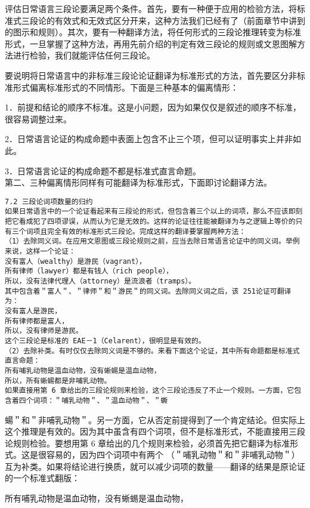 评估日常语言三段论要满足两个条件。首先，要有一种便于应用的检验方法，将标准式三段论的有效式和无效式区分开来，这种方法我们已经有了（前面章节中讲到的图示和规则）。其次，要有一种翻译方法，将任何形式的三段论推理转变为标准形式，一旦掌握了这种方法，再用先前介绍的判定有效三段论的规则或文恩图解方法进行检验，我们就能评估任何三段论。

要说明将日常语言中的非标准三段论论证翻译为标准形式的方法，首先要区分非标准形式偏离标准形式的不同情形。下面是三种基本的偏离情形：

1．前提和结论的顺序不标准。这是小问题，因为如果仅仅是叙述的顺序不标准，很容易调整过来。

2．日常语言论证的构成命题中表面上包含不止三个项，但可以证明事实上并非如此。

3．日常语言论证的构成命题不都是标准式直言命题。\\
第二、三种偏离情形同样有可能翻译为标准形式，下面即讨论翻译方法。

\begin{verbatim}
7.2 三段论词项数量的归约
如果日常语言中的一个论证看起来有三段论的形式，但包含着三个以上的词项，那么不应该即刻把它看成犯了四项谬误，从而认为它是无效的。这样的论证往往能被翻译为与之逻辑上等价的只有三个词项且完全有效的标准形式三段论。完成这样的翻译要掌握两种方法：
（1）去除同义词。在应用文恩图或三段论规则之前，应当去除日常语言论证中的同义词。举例来说，这样一个论证：
没有富人（wealthy）是游民（vagrant），
所有律师（lawyer）都是有钱人（rich people），
所以，没有法律代理人（attorney）是流浪者（tramps）。
其中包含着＂富人＂、＂律师＂和＂游民＂的同义词。去除同义词之后，该 251论证可翻译为：
没有富人是游民，
所有律师都是富人，
所以，没有律师是游民。
这个三段论是标准的 EAE－1（Celarent），很明显是有效的。
（2）去除补类。有时仅仅去除同义词是不够的。来看下面这个论证，其中所有命题都是标准式直言命题：
所有哺乳动物是温血动物，没有蜥蜴是温血动物，
所以，所有蜥蜴都是非哺乳动物。
如果直接用第 6 章给出的三段论规则来检验，这个三段论违反了不止一个规则。一方面，它包含着四个词项：＂哺乳动物＂、＂温血动物＂、＂蟖
\end{verbatim}

蝪＂和＂非哺乳动物＂。另一方面，它从否定前提得到了一个肯定结论。但实际上这个推理是有效的。因为其中虽含有四个词项，但不是标准形式，不能直接用三段论规则检验。要想用第 6 章给出的几个规则来检验，必须首先把它翻译为标准形式。这是很容易的，因为四个词项中有两个 （＂哺乳动物＂和＂非哺乳动物＂）互为补类。如果将结论进行换质，就可以减少词项的数量——翻译的结果是原论证的一个标准式翻版：

所有哺乳动物是温血动物，没有蜥蜴是温血动物，

